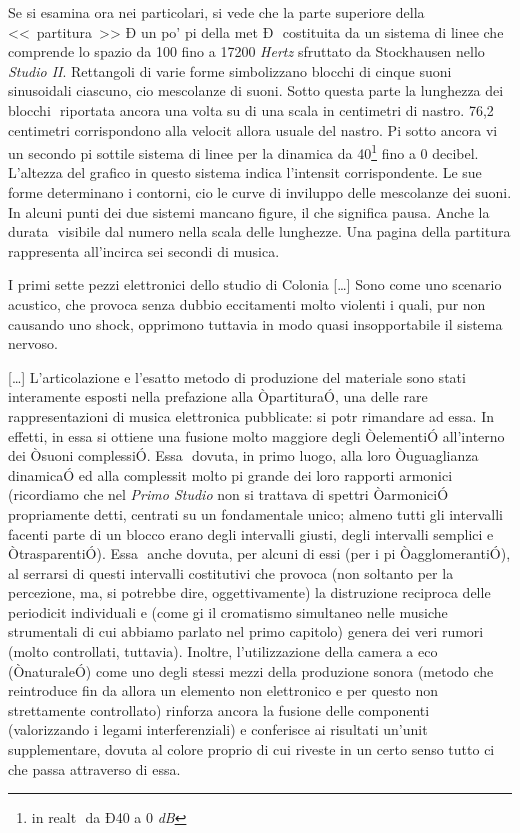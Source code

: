 Se si esamina ora nei particolari, si vede che la parte superiore della <<~partitura~>> Ð un po' pi della met Ð  costituita da un sistema di linee che comprende lo spazio da 100 fino a 17200 \emph{Hertz} sfruttato da Stockhausen nello \textit{Studio II}. Rettangoli di varie forme simbolizzano blocchi di cinque suoni sinusoidali ciascuno, cio mescolanze di suoni. Sotto questa parte la lunghezza dei blocchi  riportata ancora una volta su di una scala in centimetri di nastro. 76,2 centimetri corrispondono alla velocit allora usuale del nastro. Pi sotto ancora vi  un secondo pi sottile sistema di linee per la dinamica da 40\footnote{in realt  da Ð40 a 0 \emph{dB}} fino a 0 decibel. L'altezza del grafico in questo sistema indica l'intensit corrispondente. Le sue forme determinano i contorni, cio le curve di inviluppo delle mescolanze dei suoni. In alcuni punti dei due sistemi mancano figure, il che significa pausa. Anche la durata  visibile dal numero nella scala delle lunghezze. Una pagina della partitura rappresenta all'incirca sei secondi di musica.

I primi sette pezzi elettronici dello studio di Colonia [\ldots] Sono come uno scenario acustico, che provoca senza dubbio eccitamenti molto violenti i quali, pur non causando uno shock, opprimono tuttavia in modo quasi insopportabile il sistema nervoso.

[\ldots] L'articolazione e l'esatto metodo di produzione del materiale sono stati interamente esposti nella prefazione alla ÒpartituraÓ, una delle rare rappresentazioni di musica elettronica pubblicate: si potr rimandare ad essa. In effetti, in essa 
si ottiene una fusione molto maggiore degli ÒelementiÓ all'interno dei Òsuoni complessiÓ. Essa  dovuta, in primo luogo, alla loro Òuguaglianza dinamicaÓ ed alla complessit molto pi grande dei loro rapporti armonici (ricordiamo che nel \textit{Primo Studio} non si trattava di spettri ÒarmoniciÓ propriamente detti, centrati su un fondamentale unico; almeno tutti gli intervalli facenti parte di un blocco erano degli intervalli giusti, degli intervalli semplici e ÒtrasparentiÓ). Essa  
anche dovuta, per alcuni di essi (per i pi ÒagglomerantiÓ), al serrarsi di questi intervalli costitutivi che provoca (non soltanto per la percezione, ma, si potrebbe dire, oggettivamente) la distruzione reciproca delle periodicit individuali e (come gi il cromatismo simultaneo nelle musiche strumentali di cui abbiamo parlato nel primo capitolo) genera dei veri rumori (molto controllati, tuttavia). Inoltre, l'utilizzazione della camera a eco (ÒnaturaleÓ) come uno degli stessi mezzi della produzione sonora (metodo che reintroduce fin da allora un elemento non elettronico e per questo non strettamente controllato) rinforza ancora la fusione delle componenti (valorizzando i legami interferenziali) e conferisce ai risultati un'unit supplementare, dovuta al colore proprio di cui riveste in un certo senso tutto ci che 
passa attraverso di essa. 

